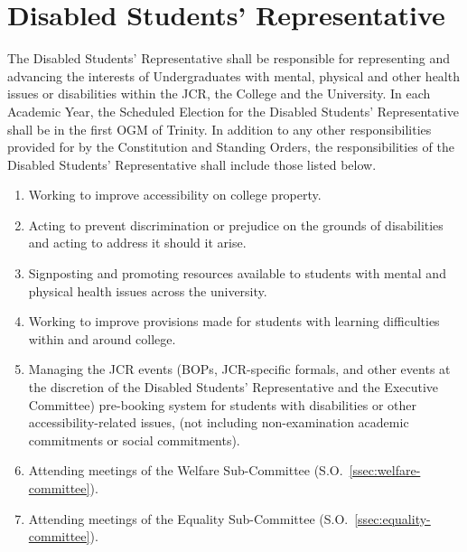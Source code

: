 \section{Disabled Students' Representative}
\npara The Disabled Students' Representative shall be responsible for representing and advancing the interests of Undergraduates with mental, physical and other health issues or disabilities within the JCR, the College and the University. 
\npara In each Academic Year, the Scheduled Election for the Disabled Students' Representative shall be in the first OGM of Trinity.
\npara In addition to any other responsibilities provided for by the Constitution and Standing Orders, the responsibilities of the Disabled Students' Representative shall include those listed below.
\begin{enumerate}
	\item Working to improve accessibility on college property.
	\item Acting to prevent discrimination or prejudice on the grounds of disabilities and acting to address it should it arise.
	\item Signposting and promoting resources available to students with mental and physical health issues across the university.
	\item Working to improve provisions made for students with learning difficulties within and around college.
	\item Managing the JCR events (BOPs, JCR-specific formals, and other events at the discretion of the Disabled Students' Representative and the Executive Committee) pre-booking system for students with disabilities or other accessibility-related issues, (not including non-examination academic commitments or social commitments).
	\item Attending meetings of the Welfare Sub-Committee (S.O.~\ref{ssec:welfare-committee}).
	\item Attending meetings of the Equality Sub-Committee (S.O.~\ref{ssec:equality-committee}).
\end{enumerate}
